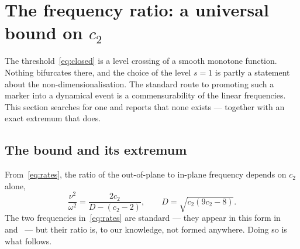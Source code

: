\documentclass[11pt,a4paper]{article}
\begin{document}
\section{The frequency ratio: a universal bound on \texorpdfstring{$c_2$}{c2}}\label{sec:freq}

The threshold~\eqref{eq:closed} is a level crossing of a smooth monotone
function. Nothing bifurcates there, and the choice of the level $s=1$ is partly
a statement about the non-dimensionalisation. The standard route to promoting
such a marker into a dynamical event is a commensurability of the linear
frequencies. This section searches for one and reports that none exists ---
together with an exact extremum that does.

\subsection{The bound and its extremum}

From~\eqref{eq:rates}, the ratio of the out-of-plane to in-plane frequency
depends on $c_2$ alone,
\begin{equation}
  \frac{\nu^{2}}{\omega^{2}} = \frac{2c_2}{D-(c_2-2)},
  \qquad D=\sqrt{c_2(9c_2-8)} .
  \label{eq:R}
\end{equation}
The two frequencies in~\eqref{eq:rates} are standard --- they appear in this
form in~\cite{gomez2001} and~\cite{ceccaroni2016} --- but their ratio is, to our
knowledge, not formed anywhere. Doing so is what follows.
\end{document}
